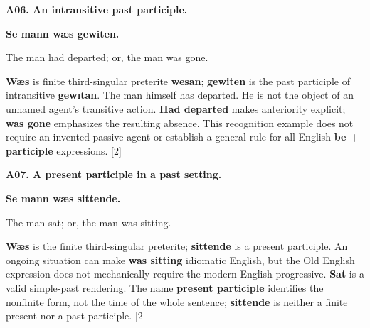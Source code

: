 \par\begin{minipage}{\linewidth}\raggedright
\textbf{A06. An intransitive past participle.}

\textbf{Se mann wæs gewiten.}

The man had departed; or, the man was gone.

\textbf{Wæs} is finite third-singular preterite \textbf{wesan}; \textbf{gewiten} is the past participle of intransitive \textbf{gewītan}. The man himself has departed. He is not the object of an unnamed agent's transitive action. \textbf{Had departed} makes anteriority explicit; \textbf{was gone} emphasizes the resulting absence. This recognition example does not require an invented passive agent or establish a general rule for all English \textbf{be + participle} expressions. [2]

\end{minipage}\par\addvspace{4pt}

\par\begin{minipage}{\linewidth}\raggedright
\textbf{A07. A present participle in a past setting.}

\textbf{Se mann wæs sittende.}

The man sat; or, the man was sitting.

\textbf{Wæs} is the finite third-singular preterite; \textbf{sittende} is a present participle. An ongoing situation can make \textbf{was sitting} idiomatic English, but the Old English expression does not mechanically require the modern English progressive. \textbf{Sat} is a valid simple-past rendering. The name \textbf{present participle} identifies the nonfinite form, not the time of the whole sentence; \textbf{sittende} is neither a finite present nor a past participle. [2]

\end{minipage}\par\addvspace{4pt}

